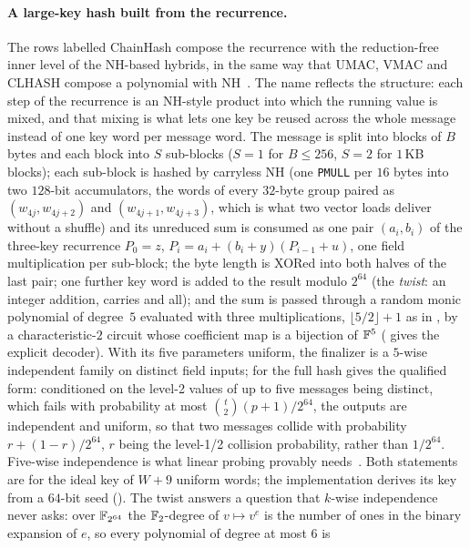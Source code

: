 \paragraph{A large-key hash built from the recurrence.}
The rows labelled ChainHash compose the recurrence with the reduction-free
inner level of the NH-based hybrids, in the same way that UMAC, VMAC and CLHASH
compose a polynomial with NH~\cite{black1999umac,lemire2015clhash}.  The name
reflects the structure: each step of the recurrence is an NH-style product into
which the running value is mixed, and that mixing is what lets one key be reused
across the whole message instead of one key word per message word.  The message
is split into blocks of $B$ bytes and each block into $S$ sub-blocks ($S=1$ for
$B\le256$, $S=2$ for $1$\,KB blocks); each sub-block is hashed by carryless NH
(one \texttt{PMULL} per $16$ bytes into two $128$-bit accumulators, the words
of every $32$-byte group paired as $(w_{4j},w_{4j+2})$ and
$(w_{4j+1},w_{4j+3})$, which is what two vector loads deliver without a
shuffle) and its
unreduced sum is consumed as one pair $(a_i,b_i)$ of the three-key recurrence
$P_0=z$, $P_i=a_i+(b_i+y)(P_{i-1}+u)$, one field multiplication per
sub-block; the byte length is XORed into both halves of the last pair; one further key
word is added to the result modulo $2^{64}$ (the \emph{twist}: an integer
addition, carries and all); and the sum is passed through a random monic
polynomial of degree~$5$ evaluated with three multiplications,
$\lfloor5/2\rfloor+1$ as in , by a characteristic-$2$ circuit
whose coefficient map is a bijection of $\mathbb{F}^5$ ( gives the
explicit decoder).  With its five parameters uniform, the finalizer is a
$5$-wise independent family on distinct field inputs; for the full hash
 gives the qualified form: conditioned on the level-2
values of up to five messages being distinct, which fails with probability
at most $\binom{t}{2}(p+1)/2^{64}$, the outputs are independent and uniform,
so that two messages collide with probability $r+(1-r)/2^{64}$, $r$ being the
level-1/2 collision probability, rather than $1/2^{64}$.  Five-wise
independence is what linear probing provably
needs~\cite{pagh2009linear,patracscu2016kindependence}.  Both statements are
for the ideal key of $W+9$ uniform words; the implementation derives its key
from a $64$-bit seed ().
The twist answers a question that $k$-wise independence never asks: over
$\mathbb{F}_{2^{64}}$ the $\mathbb{F}_2$-degree of $v\mapsto v^e$ is the number of ones in
the binary expansion of $e$, so every polynomial of degree at most $6$ is
